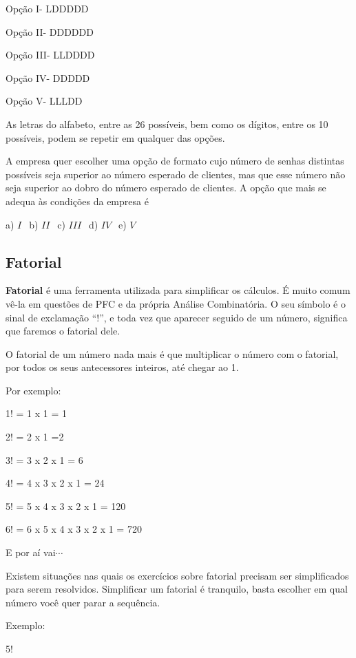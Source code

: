 \begin{multicols*}{2}
		      Opção I- LDDDDD

		      Opção II- DDDDDD

		      Opção III- LLDDDD

		      Opção IV- DDDDD

		      Opção V- LLLDD

		      As letras do alfabeto, entre as 26 possíveis, bem como os dígitos, entre os 10 possíveis, podem se repetir em qualquer das opções.

		      A empresa quer escolher uma opção de formato cujo número de senhas distintas possíveis seja superior ao número esperado de clientes, mas que esse número não seja superior ao dobro do número esperado de clientes.
		      A opção que mais se adequa às condições da empresa é

		      a) $ I \ \ $ b) $II \ \ $ c) $III \ \ $ d) $IV \ \ $ e) $V \ \ $


	\subsection{Fatorial}

	\textbf{Fatorial} é uma ferramenta utilizada para simplificar os cálculos. É muito comum vê-la em questões de PFC e da própria Análise Combinatória. O seu símbolo é o sinal de exclamação “!”, e toda vez que aparecer seguido de um número, significa que faremos o fatorial dele.

	O fatorial de um número nada mais é que multiplicar o número com o fatorial, por todos os seus antecessores inteiros, até chegar ao 1.

	Por exemplo:

	1! = 1 x 1 = 1

	2! = 2 x 1 =2

	3! = 3 x 2 x 1 = 6

	4! = 4 x 3 x 2 x 1 = 24

	5! = 5 x 4 x 3 x 2 x 1 = 120

	6! = 6 x 5 x 4 x 3 x 2 x 1 = 720

	E por aí vai$\cdots$

	Existem situações nas quais os exercícios sobre fatorial precisam ser simplificados para serem resolvidos. Simplificar um fatorial é tranquilo, basta escolher em qual número você quer parar a sequência.

	Exemplo:

	5!


\end{multicols*}
